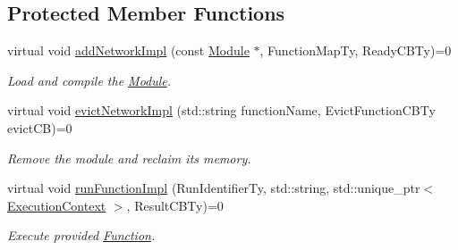 \subsection*{Protected Member Functions}
\begin{DoxyCompactItemize}
\item 
virtual void \hyperlink{classglow_1_1runtime_1_1_queue_backed_device_manager_a47a2b12e364f822961c904c7c123924a}{add\+Network\+Impl} (const \hyperlink{classglow_1_1_module}{Module} $\ast$, Function\+Map\+Ty, Ready\+C\+B\+Ty)=0
\begin{DoxyCompactList}\small\item\em Load and compile the \hyperlink{classglow_1_1_module}{Module}. \end{DoxyCompactList}\item 
\mbox{\label{classglow_1_1runtime_1_1_queue_backed_device_manager_a4b3ae3ad0f78cd72b2d35cac4a10280f}} 
virtual void \hyperlink{classglow_1_1runtime_1_1_queue_backed_device_manager_a4b3ae3ad0f78cd72b2d35cac4a10280f}{evict\+Network\+Impl} (std\+::string function\+Name, Evict\+Function\+C\+B\+Ty evict\+CB)=0
\begin{DoxyCompactList}\small\item\em Remove the module and reclaim its memory. \end{DoxyCompactList}\item 
\mbox{\label{classglow_1_1runtime_1_1_queue_backed_device_manager_a9ff4d91593080b083667b4270f05a850}} 
virtual void \hyperlink{classglow_1_1runtime_1_1_queue_backed_device_manager_a9ff4d91593080b083667b4270f05a850}{run\+Function\+Impl} (Run\+Identifier\+Ty, std\+::string, std\+::unique\+\_\+ptr$<$ \hyperlink{classglow_1_1_execution_context}{Execution\+Context} $>$, Result\+C\+B\+Ty)=0
\begin{DoxyCompactList}\small\item\em Execute provided \hyperlink{classglow_1_1_function}{Function}. \end{DoxyCompactList}\end{DoxyCompactItemize}
